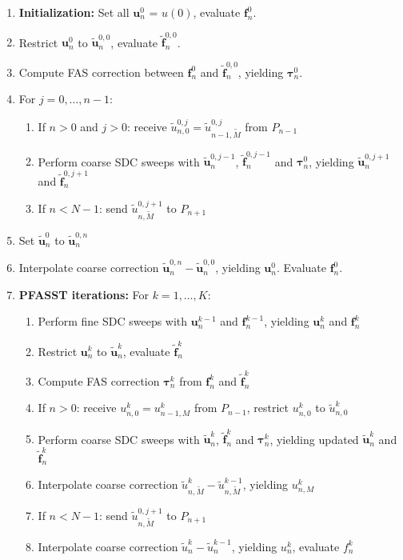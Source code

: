 \begin{enumerate}
    \item \textbf{Initialization:} Set all \(\bm{u}^0_n\) = \(u(0)\), evaluate \(\bm{f}^0_n\).
    \item Restrict \(\bm{u}^0_n\) to \(\bm{\tilde{u}}^{0,0}_n\), evaluate \(\bm{\tilde{f}}^{0,0}_n\).
    \item Compute FAS correction between \(\bm{f}^0_n\) and \(\bm{\tilde{f}}^{0,0}_n\), yielding \(\bm{\tau}^0_n\).
    \item For \(j = 0, \dots, n-1\):
        \begin{enumerate}    
            \item If \(n > 0\) and \(j > 0\): receive \(\tilde{u}^{0,j}_{n,0}=\tilde{u}^{0,j}_{n-1,\tilde{M}}\) from \(P_{n-1}\)
            \item Perform coarse SDC sweeps with \(\bm{\tilde{u}}^{0,j-1}_{n}\), \(\bm{\tilde{f}}^{0,j-1}_n\) and \(\bm{\tau}^0_n\), yielding \(\bm{\tilde{u}}^{0,j+1}_{n}\) and \(\bm{\tilde{f}}^{0,j+1}_n\)
            \item If \(n < N-1\): send \(\tilde{u}^{0,j+1}_{n,\tilde{M}}\) to \(P_{n+1}\)
        \end{enumerate}
    \item Set \(\bm{\tilde{u}}^{0}_{n}\) to \(\bm{\tilde{u}}^{0,n}_{n}\) %
    \item Interpolate coarse correction \(\bm{\tilde{u}}^{0,n}_{n} - \bm{\tilde{u}}^{0,0}_{n}\), yielding \(\bm{u}^{0}_{n}\). Evaluate \(\bm{f}^{0}_{n}\).
    \item \textbf{PFASST iterations:} For \(k = 1, \dots, K\):
        \begin{enumerate}
            \item Perform fine SDC sweeps with \(\bm{u}^{k-1}_{n}\) and \(\bm{f}^{k-1}_{n}\), yielding \(\bm{u}^{k}_{n}\) and \(\bm{f}^{k}_{n}\)
            \item Restrict \(\bm{u}^{k}_{n}\) to \(\bm{\tilde{u}}^{k}_{n}\), evaluate \(\bm{\tilde{f}}^{k}_{n}\)
            \item Compute FAS correction \(\bm{\tau}^k_n\) from \(\bm{f}^{k}_{n}\) and \(\bm{\tilde{f}}^{k}_{n}\)
            \item If \(n > 0\): receive \(u^{k}_{n,0}=u^{k}_{n-1,M}\) from \(P_{n-1}\), restrict \(u^{k}_{n,0}\) to \(\tilde{u}^{k}_{n,0}\)
            \item Perform coarse SDC sweeps with \(\bm{\tilde{u}}^{k}_{n}\), \(\bm{\tilde{f}}^{k}_{n}\) and \(\bm{\tau}^k_n\), yielding updated \(\bm{\tilde{u}}^{k}_{n}\) and \(\bm{\tilde{f}}^{k}_{n}\)
            \item Interpolate coarse correction \(\tilde{u}^{k}_{n,\tilde{M}} - \tilde{u}^{k-1}_{n,\tilde{M}}\), yielding \(u^{k}_{n,M}\)
            \item If \(n < N-1\): send \(\tilde{u}^{0,j+1}_{n,\tilde{M}}\) to \(P_{n+1}\)
            \item Interpolate coarse correction \(\tilde{u}^{k}_{n} - \tilde{u}^{k-1}_{n}\), yielding \(u^{k}_{n}\), evaluate \(f^{k}_{n}\)
        \end{enumerate}
\end{enumerate}

